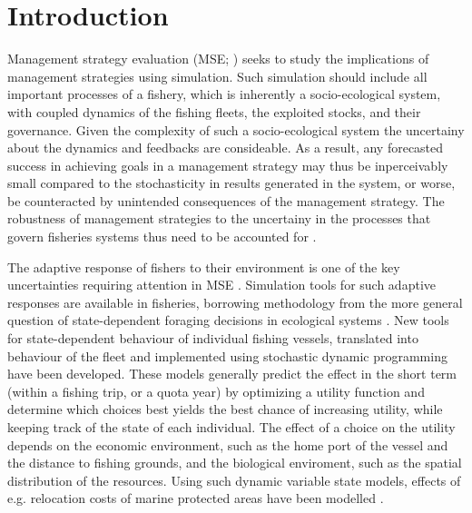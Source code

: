 \documentclass[12pt,oneline,a4paper,numbib]{ouparticle}
\numberwithin{equation}{subsection} %
\begin{document}
\maketitle

\section{Introduction}

Management strategy evaluation (MSE; \cite{Bunnefeld2011, Sainsbury2000, Smith1994}) seeks to study the implications of management strategies using simulation\cite{Punt2016}. Such simulation should include all important processes of a fishery, which is inherently a socio-ecological system, with coupled dynamics of the fishing fleets, the exploited stocks, and their governance\cite{Punt2016,Rasemeyer2007}. Given the complexity of such a socio-ecological system the uncertainy about the dynamics and feedbacks are consideable. As a result, any forecasted success in achieving goals in a management strategy may thus be inperceivably small compared to the stochasticity in results generated in the system, or worse, be counteracted by unintended consequences of the management strategy. The robustness of management strategies to the uncertainy in the processes that govern fisheries systems thus need to be accounted for \cite{Andersen2010, Kell2007, Prellezo2016, Punt2016}. 

The adaptive response of fishers to their environment is one of the key uncertainties requiring attention in MSE \cite{Fulton2007}. Simulation tools for such adaptive responses are available in fisheries, borrowing methodology from the more general question of state-dependent foraging decisions in ecological systems \cite{ClarkandMangel2000,Houston1999}. New tools for state-dependent behaviour of individual fishing vessels, translated into behaviour of the fleet and implemented using stochastic dynamic programming \cite{Alzorriz2018,Batsleer2015, Dowling2011, Poos2010, Gillis1995} have been developed. These models generally predict the effect in the short term (within a fishing trip, or a quota year) by optimizing a utility function and determine which choices best yields the best chance of increasing utility, while keeping track of the state of each individual. The effect of a choice on the utility depends on the economic environment, such as the home port of the vessel and the distance to fishing grounds, and the biological enviroment, such as the spatial distribution of the resources. Using such dynamic variable state models, effects of e.g. relocation costs of marine protected areas have been modelled \cite{Dowling2011}.
\end{document}

